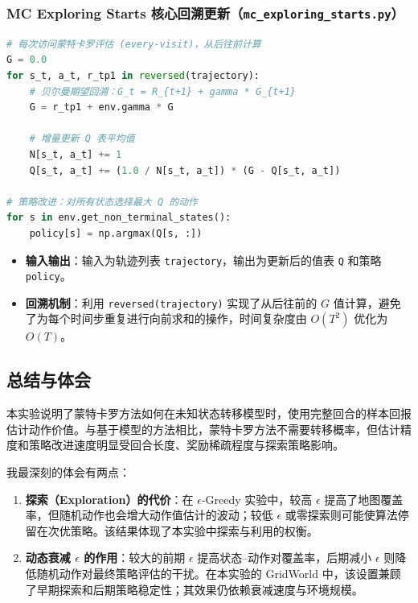 \documentclass[11pt,a4paper,UTF8]{ctexart}
\numberwithin{figure}{section}
\numberwithin{table}{section}
\begin{document}
\subsubsection{MC Exploring Starts 核心回溯更新（\texttt{mc\_exploring\_starts.py}）}

\begin{lstlisting}[language=python]
# 每次访问蒙特卡罗评估 (every-visit)，从后往前计算
G = 0.0
for s_t, a_t, r_tp1 in reversed(trajectory):
    # 贝尔曼期望回溯：G_t = R_{t+1} + gamma * G_{t+1}
    G = r_tp1 + env.gamma * G
    
    # 增量更新 Q 表平均值
    N[s_t, a_t] += 1
    Q[s_t, a_t] += (1.0 / N[s_t, a_t]) * (G - Q[s_t, a_t])
    
# 策略改进：对所有状态选择最大 Q 的动作
for s in env.get_non_terminal_states():
    policy[s] = np.argmax(Q[s, :])
\end{lstlisting}
\begin{itemize}
\item \textbf{输入输出}：输入为轨迹列表 \texttt{trajectory}，输出为更新后的值表 \texttt{Q} 和策略 \texttt{policy}。
\item \textbf{回溯机制}：利用 \texttt{reversed(trajectory)} 实现了从后往前的 $G$ 值计算，避免了为每个时间步重复进行向前求和的操作，时间复杂度由 $O(T^2)$ 优化为 $O(T)$。
\end{itemize}
\subsection{总结与体会}

本实验说明了蒙特卡罗方法如何在未知状态转移模型时，使用完整回合的样本回报估计动作价值。与基于模型的方法相比，蒙特卡罗方法不需要转移概率，但估计精度和策略改进速度明显受回合长度、奖励稀疏程度与探索策略影响。

我最深刻的体会有两点：
\begin{enumerate}
\item \textbf{探索（Exploration）的代价}：在 $\epsilon$-Greedy 实验中，较高 $\epsilon$ 提高了地图覆盖率，但随机动作也会增大动作值估计的波动；较低 $\epsilon$ 或零探索则可能使算法停留在次优策略。该结果体现了本实验中探索与利用的权衡。
\item \textbf{动态衰减 $\epsilon$ 的作用}：较大的前期 $\epsilon$ 提高状态--动作对覆盖率，后期减小 $\epsilon$ 则降低随机动作对最终策略评估的干扰。在本实验的 GridWorld 中，该设置兼顾了早期探索和后期策略稳定性；其效果仍依赖衰减速度与环境规模。
\end{enumerate}

\newpage
\end{document}
